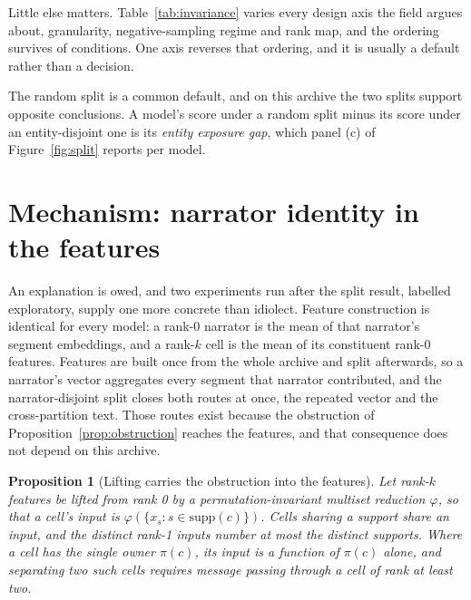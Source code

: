 \documentclass[conference]{IEEEtran}
\newtheorem{proposition}{Proposition}
\begin{document}
Little else matters. Table~\ref{tab:invariance} varies every design axis the field argues
about, granularity, negative-sampling regime and rank map, and the ordering survives
\invarianceWins{} of \invarianceTotal{} conditions. One axis reverses that ordering, and it is
usually a default rather than a decision.

\begin{table}[t]\centering
\caption{The system-level ordering survives every design choice except the split. Each row
varies one
axis with the rest held at the primary cell, and reports how often the typed star leads the
complex on T1 MAP. Every cell uses the star as registered; the input-matched ordering is in
Section~\ref{sec:p3}.}
\label{tab:invariance}
{\footnotesize}\end{table}

The random split is a common default, and on this archive the two splits support opposite
conclusions. A model's score under a random split minus its score under an
entity-disjoint one is its \emph{entity exposure gap}, which panel (c) of
Figure~\ref{fig:split} reports per model.

\section{Mechanism: narrator identity in the features}
\label{sec:mechanism}

An explanation is owed, and two experiments run after the split result, labelled exploratory,
supply one more concrete than idiolect. Feature construction is identical for every model: a
rank-0 narrator
is the mean of that narrator's segment embeddings, and a rank-$k$ cell is the mean of its
constituent rank-0 features. Features are built once from the whole archive and split
afterwards, so a narrator's vector aggregates every segment that narrator contributed, and
the narrator-disjoint split closes both routes at once, the repeated vector and the
cross-partition text. Those routes exist because the obstruction of
Proposition~\ref{prop:obstruction} reaches the
features, and that consequence does not depend on this archive.

\begin{proposition}[Lifting carries the obstruction into the features]
\label{prop:singleton}
Let rank-$k$ features be lifted from rank 0 by a permutation-invariant multiset reduction
$\varphi$, so that a cell's input is $\varphi(\{x_s : s \in \mathrm{supp}(c)\})$. Cells sharing
a support share an input, and the distinct rank-1 inputs number at most the distinct supports.
Where a cell has the single owner $\pi(c)$, its input is a function of $\pi(c)$ alone, and
separating two such cells requires message passing through a cell of rank at least two.
\end{proposition}
\end{document}
